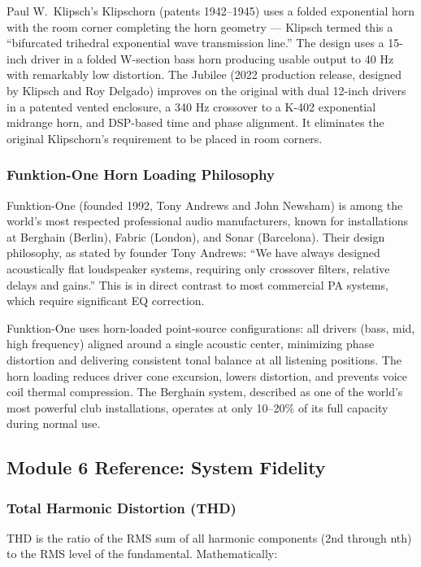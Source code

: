 \documentclass[11pt,letterpaper]{article}
\begin{document}
Paul W.\ Klipsch's Klipschorn (patents 1942--1945) uses a folded exponential horn with the room corner completing the horn geometry --- Klipsch termed this a ``bifurcated trihedral exponential wave transmission line.'' The design uses a 15-inch driver in a folded W-section bass horn producing usable output to 40 Hz with remarkably low distortion. The Jubilee (2022 production release, designed by Klipsch and Roy Delgado) improves on the original with dual 12-inch drivers in a patented vented enclosure, a 340 Hz crossover to a K-402 exponential midrange horn, and DSP-based time and phase alignment. It eliminates the original Klipschorn's requirement to be placed in room corners.

\subsubsection{Funktion-One Horn Loading Philosophy}

Funktion-One (founded 1992, Tony Andrews and John Newsham) is among the world's most respected professional audio manufacturers, known for installations at Berghain (Berlin), Fabric (London), and Sonar (Barcelona). Their design philosophy, as stated by founder Tony Andrews: ``We have always designed acoustically flat loudspeaker systems, requiring only crossover filters, relative delays and gains.'' This is in direct contrast to most commercial PA systems, which require significant EQ correction.

Funktion-One uses horn-loaded point-source configurations: all drivers (bass, mid, high frequency) aligned around a single acoustic center, minimizing phase distortion and delivering consistent tonal balance at all listening positions. The horn loading reduces driver cone excursion, lowers distortion, and prevents voice coil thermal compression. The Berghain system, described as one of the world's most powerful club installations, operates at only 10--20\% of its full capacity during normal use.

\subsection{Module 6 Reference: System Fidelity}

\subsubsection{Total Harmonic Distortion (THD)}

THD is the ratio of the RMS sum of all harmonic components (2nd through nth) to the RMS level of the fundamental. Mathematically:
\end{document}
